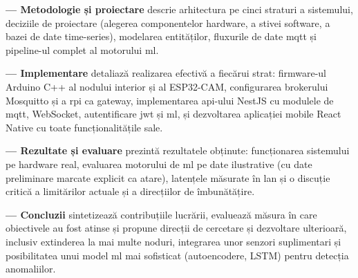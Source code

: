 \textbf{ — Metodologie și proiectare} descrie arhitectura
pe cinci straturi a sistemului, deciziile de proiectare (alegerea componentelor
hardware, a stivei software, a bazei de date time-series), modelarea entităților,
fluxurile de date \gls{mqtt} și pipeline-ul complet al motorului \gls{ml}.

\textbf{ — Implementare} detaliază realizarea efectivă a
fiecărui strat: firmware-ul Arduino C++ al nodului interior și al ESP32-CAM,
configurarea brokerului Mosquitto și a \gls{rpi} ca gateway, implementarea
\gls{api}-ului NestJS cu modulele de \gls{mqtt}, WebSocket, autentificare \gls{jwt}
și \gls{ml}, și dezvoltarea aplicației mobile React Native cu toate funcționalitățile
sale.

\textbf{ — Rezultate și evaluare} prezintă rezultatele
obținute: funcționarea sistemului pe hardware real, evaluarea motorului de \gls{ml}
pe date ilustrative (cu date preliminare marcate explicit ca atare), latențele
măsurate în \gls{lan} și o discuție critică a limitărilor actuale și a direcțiilor
de îmbunătățire.

\textbf{ — Concluzii} sintetizează contribuțiile lucrării,
evaluează măsura în care obiectivele au fost atinse și propune direcții de
cercetare și dezvoltare ulterioară, inclusiv extinderea la mai multe noduri,
integrarea unor senzori suplimentari și posibilitatea unui model \gls{ml} mai
sofisticat (autoencodere, LSTM) pentru detecția anomaliilor.
